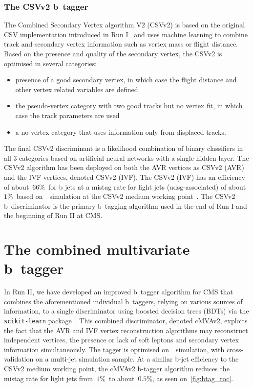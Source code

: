\subsubsection{The CSVv2 b~tagger}
The Combined Secondary Vertex algorithm V2 (CSVv2) is based on the original CSV implementation introduced in Run I~\cite{Chatrchyan:2012jua} and uses machine learning to combine track and secondary vertex information such as vertex mass or flight distance. Based on the presence and quality of the secondary vertex, the CSVv2 is optimised in several categories:
\begin{itemize}
\item presence of a good secondary vertex, in which case the flight distance and other vertex related variables are defined
\item the pseudo-vertex category with two good tracks but no vertex fit, in which case the track parameters are used
\item a no vertex category that uses information only from displaced tracks.
\end{itemize}
The final CSVv2 discriminant is a likelihood combination of binary classifiers in all 3 categories based on artificial neural networks with a single hidden layer. The CSVv2 algorithm has been deployed on both the AVR vertices as CSVv2 (AVR) and the IVF vertices, denoted CSVv2 (IVF). The CSVv2 (IVF) has an efficiency of about~$66\%$~for b jets at a mistag rate for light jets (udsg-associated) of about~$1\%$~based on~\ttbar~simulation at the CSVv2 medium working point~\cite{CMS-PAS-BTV-15-001}. The CSVv2 b~discriminator is the primary b~tagging algorithm used in the end of Run I and the beginning of Run II at CMS.

\section{The combined multivariate b~tagger}
In Run II, we have developed an improved b~tagger algorithm for CMS that combines the aforementioned individual b~taggers, relying on various sources of information, to a single discriminator using boosted decision trees (BDTs) via the \texttt{scikit-learn} package~\cite{scikit-learn}. This combined discriminator, denoted cMVAv2, exploits the fact that the AVR and IVF vertex reconstruction algorithms may reconstruct independent vertices, the presence or lack of soft leptons and secondary vertex information simultaneously. The tagger is optimised on~\ttbar~simulation, with cross-validation on a multi-jet simulation sample. At a similar b-jet efficiency to the CSVv2 medium working point, the cMVAv2 b-tagger algorithm reduces the mistag rate for light jets from~$1\%$~to about~$0.5\%$, as seen on~\cref{fig:btag_roc}.

